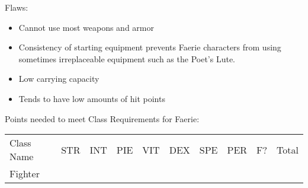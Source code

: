 \documentclass[12pt]{article}
\begin{document}
Flaws:

\begin{itemize}
\item
  Cannot use most weapons and armor
\item
  Consistency of starting equipment prevents Faerie characters from
  using sometimes irreplaceable equipment such as the Poet's Lute.
\item
  Low carrying capacity
\item
  Tends to have low amounts of hit points
\end{itemize}

Points needed to meet Class Requirements for Faerie:

\begin{longtable}[]{@{}llllllllll@{}}
\toprule
\begin{minipage}[t]{0.13\columnwidth}\raggedright\strut
Class Name
\strut\end{minipage} &
\begin{minipage}[t]{0.06\columnwidth}\raggedright\strut
STR
\strut\end{minipage} &
\begin{minipage}[t]{0.06\columnwidth}\raggedright\strut
INT
\strut\end{minipage} &
\begin{minipage}[t]{0.06\columnwidth}\raggedright\strut
PIE
\strut\end{minipage} &
\begin{minipage}[t]{0.06\columnwidth}\raggedright\strut
VIT
\strut\end{minipage} &
\begin{minipage}[t]{0.06\columnwidth}\raggedright\strut
DEX
\strut\end{minipage} &
\begin{minipage}[t]{0.06\columnwidth}\raggedright\strut
SPE
\strut\end{minipage} &
\begin{minipage}[t]{0.06\columnwidth}\raggedright\strut
PER
\strut\end{minipage} &
\begin{minipage}[t]{0.07\columnwidth}\raggedright\strut
F?
\strut\end{minipage} &
\begin{minipage}[t]{0.08\columnwidth}\raggedright\strut
Total
\strut\end{minipage}\tabularnewline
\begin{minipage}[t]{0.13\columnwidth}\raggedright\strut
Fighter
\strut\end{minipage} &

\end{longtable}
\end{document}
